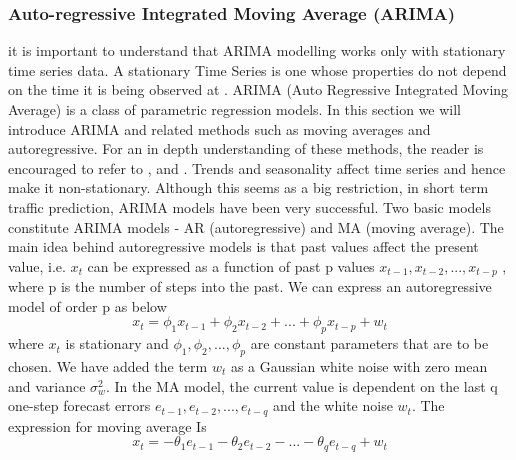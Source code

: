 \subsubsection{Auto-regressive Integrated Moving Average (ARIMA)}
it is  important to understand that ARIMA modelling works only with stationary time series data. A stationary Time Series is one whose properties do not depend on the time it is being observed at .
ARIMA (Auto Regressive Integrated Moving Average) is a class of parametric regression models. In this section we will introduce ARIMA and related methods such as moving averages and autoregressive.
For an in depth understanding of these methods, the reader is encouraged to refer to \cite{tong1990non},\cite{brockwell2006introduction} and \cite{box2015time}.
Trends and seasonality affect time series and hence make it non-stationary. Although this seems as a big restriction, in short term traffic prediction, ARIMA models have been very successful. Two basic models constitute ARIMA models - AR (autoregressive) and MA (moving average).
The main idea behind autoregressive models is that past values affect the present value, i.e. $x_{t}$ can be expressed as a function of past p values $ x_{t-1}, x_{t-2},...,x_{t-p} $ , where p is the number of steps into the past. We can express an autoregressive model of order p as below
        \begin{equation} \label{eq:autoregressive}
          x_{t} = \phi_{1}x_{t-1} + \phi_{2}x_{t-2} + ... + \phi_{p}x_{t-p} + w_{t}
        \end{equation}
where $x_{t}$ is stationary and $\phi_{1}, \phi_{2},..., \phi_{p}$ are constant parameters that are to be chosen. We have added the term $w_{t}$ as a Gaussian white noise with zero mean and variance $\sigma^{2}_{w}$.
In the MA model, the current value is dependent on the last q one-step forecast errors $e_{t-1}, e_{t-2},...,e_{t-q}$ and the white noise $w_{t}$. The expression for moving average Is
        \begin{equation} \label{eq:movingaverage}
          x_{t} = -\theta_{1}e_{t-1} - \theta_{2}e_{t-2} - ... - \theta_{q}e_{t-q} + w_{t}
        \end{equation}

